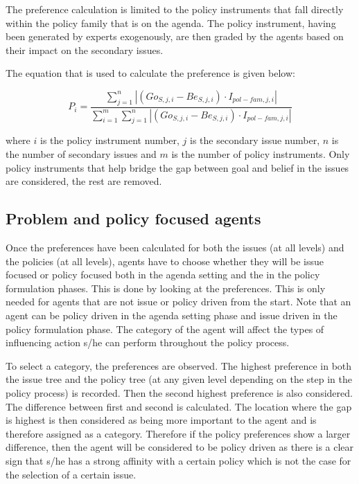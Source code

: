 \documentclass[11pt]{article}
\begin{document}
The preference calculation is limited to the policy instruments that fall directly within the policy family that is on the agenda. The policy instrument, having been generated by experts exogenously, are then graded by the agents based on their impact on the secondary issues. 

The equation that is used to calculate the preference is given below:

\begin{equation}
P_i = \frac{ \sum_{j=1}^{n} \left| \left(Go_{S,j,i} - Be_{S,j,i} \right) \cdot I_{pol-fam,j,i} \right| }{ \sum_{i=1}^{m}  \sum_{j=1}^{n} \left| \left(Go_{S,j,i} - Be_{S,j,i} \right) \cdot I_{pol-fam,j,i} \right|}
\end{equation}

where $i$ is the policy instrument number, $j$ is the secondary issue number, $n$ is the number of secondary issues and $m$ is the number of policy instruments. Only policy instruments that help bridge the gap between goal and belief in the issues are considered, the rest are removed.


\subsection{Problem and policy focused agents}
\label{ssec:selectionPolicyProblemFocus}

Once the preferences have been calculated for both the issues (at all levels) and the policies (at all levels), agents have to choose whether they will be issue focused or policy focused both in the agenda setting and the in the policy formulation phases. This is done by looking at the preferences. This is only needed for agents that are not issue or policy driven from the start. Note that an agent can be policy driven in the agenda setting phase and issue driven in the policy formulation phase. The category of the agent will affect the types of influencing action s/he can perform throughout the policy process.

To select a category, the preferences are observed. The highest preference in both the issue tree and the policy tree (at any given level depending on the step in the policy process) is recorded. Then the second highest preference is also considered. The difference between first and second is calculated. The location where the gap is highest is then considered as being more important to the agent and is therefore assigned as a category. Therefore if the policy preferences show a larger difference, then the agent will be considered to be policy driven as there is a clear sign that s/he has a strong affinity with a certain policy which is not the case for the selection of a certain issue.
\end{document}
